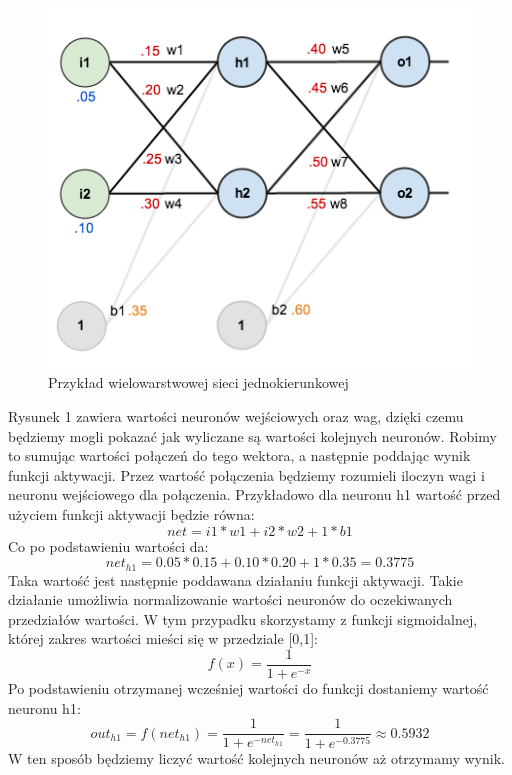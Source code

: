 \begin{figure}[!ht]
    \includegraphics[width=\linewidth]{images/feed-forward-diagram.png}
    \caption{Przykład wielowarstwowej sieci jednokierunkowej}
\end{figure}

Rysunek 1 zawiera wartości neuronów wejściowych oraz wag, dzięki czemu będziemy mogli pokazać jak wyliczane są wartości kolejnych neuronów.
Robimy to sumując wartości połączeń do tego wektora, a następnie poddając wynik funkcji aktywacji.
Przez wartość połączenia będziemy rozumieli iloczyn wagi i neuronu wejściowego dla połączenia.
Przykładowo dla neuronu h1 wartość przed użyciem funkcji aktywacji będzie równa:
\[
  net = i1*w1+i2*w2+1*b1
\]
Co po podstawieniu wartości da:
\[
  net_{h1} = 0.05*0.15+0.10*0.20+1*0.35=0.3775
\]
Taka wartość jest następnie poddawana działaniu funkcji aktywacji. 
Takie działanie umożliwia normalizowanie wartości neuronów do oczekiwanych przedziałów wartości.
W tym przypadku skorzystamy z funkcji sigmoidalnej, której zakres wartości mieści się w przedziale [0,1]:
\[
    f(x) =  \frac{\mathrm{1} }{\mathrm{1} + e^{-x} } 
\]
Po podstawieniu otrzymanej wcześniej wartości do funkcji dostaniemy wartość neuronu h1:
\[
    out_{h1} 
    = f(net_{h1}) 
    =  \frac{\mathrm{1} }{\mathrm{1} + e^{-net_{h1}} } 
    =  \frac{\mathrm{1} }{\mathrm{1} + e^{-0.3775} } \approx 0.5932
\]
W ten sposób będziemy liczyć wartość kolejnych neuronów aż otrzymamy wynik.


